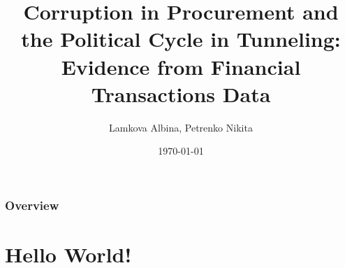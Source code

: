 \documentclass{beamer}
\title[Corruption in Procurement]{Corruption in Procurement and the Political Cycle in Tunneling: Evidence from Financial Transactions Data} %
\author{Lamkova Albina, Petrenko Nikita} %
\date{\today} %
\begin{document}
\begin{frame}
\titlepage %
\end{frame}

\begin{frame}
\frametitle{Overview} %
\tableofcontents %
\end{frame}


\section{Hello World!} %



\end{document}
